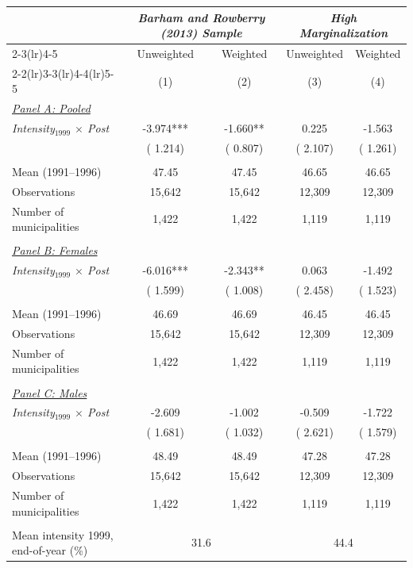 \begin{tabular}{lcccc} \hline \hline
& \multicolumn{2}{c}{\textit{Barham and Rowberry (2013) Sample}} & \multicolumn{2}{c}{\textit{High Marginalization}} \\ \cmidrule(lr){2-3}\cmidrule(lr){4-5}
& \multicolumn{1}{c}{Unweighted} & \multicolumn{1}{c}{Weighted} & \multicolumn{1}{c}{Unweighted} & \multicolumn{1}{c}{Weighted} \\ 
\cmidrule(lr){2-2}\cmidrule(lr){3-3}\cmidrule(lr){4-4}\cmidrule(lr){5-5}
& \multicolumn{1}{c}{(1)} & \multicolumn{1}{c}{(2)} & \multicolumn{1}{c}{(3)} & \multicolumn{1}{c}{(4)} \\ \toprule
\underline{\textit{Panel A: Pooled}} \\ 
\textit{Intensity$_{1999}$ $\times$ Post}&    -3.974***&    -1.660**&     0.225&    -1.563 \\ 
 & (    1.214)& (    0.807)& (    2.107)& (    1.261) \\ 
  & & & & \\ 
Mean (1991--1996)&     47.45&     47.45&     46.65&     46.65 \\ 
Observations&    15,642&    15,642&    12,309&    12,309 \\ 
Number of municipalities&     1,422&     1,422&     1,119&     1,119 \\ 
  & & & & \\ 
\underline{\textit{Panel B: Females}} \\ 
\textit{Intensity$_{1999}$ $\times$ Post}&    -6.016***&    -2.343**&     0.063&    -1.492 \\ 
 & (    1.599)& (    1.008)& (    2.458)& (    1.523) \\ 
  & & & & \\ 
Mean (1991--1996)&     46.69&     46.69&     46.45&     46.45 \\ 
Observations&    15,642&    15,642&    12,309&    12,309 \\ 
Number of municipalities&     1,422&     1,422&     1,119&     1,119 \\ 
  & & & & \\ 
\underline{\textit{Panel C: Males}} \\ 
\textit{Intensity$_{1999}$ $\times$ Post}&    -2.609&    -1.002&    -0.509&    -1.722 \\ 
 & (    1.681)& (    1.032)& (    2.621)& (    1.579) \\ 
  & & & & \\ 
Mean (1991--1996)&     48.49&     48.49&     47.28&     47.28 \\ 
Observations&    15,642&    15,642&    12,309&    12,309 \\ 
Number of municipalities&     1,422&     1,422&     1,119&     1,119 \\ 
  & & & & \\ 
Mean intensity 1999, end-of-year (\%) & \multicolumn{2}{c}{  31.6} & \multicolumn{2}{c}{  44.4} \\ 
\bottomrule
\end{tabular}